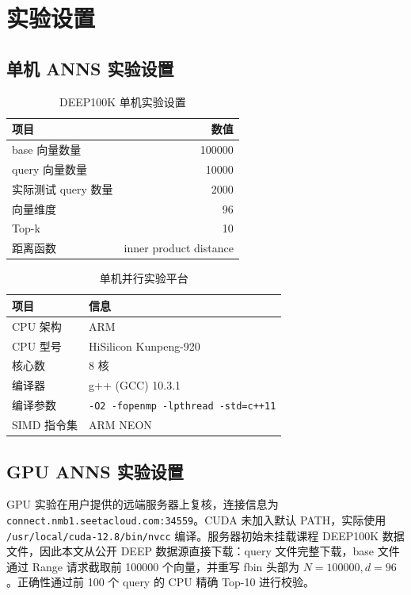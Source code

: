 \documentclass[UTF8,a4paper,10pt]{ctexart}
\begin{document}
\section{实验设置}

\subsection{单机 ANNS 实验设置}

\begin{table}[H]
\centering
\caption{DEEP100K 单机实验设置}
\label{tab:dataset}
\begin{tabular}{lr}
\toprule
项目 & 数值 \\
\midrule
base 向量数量 & 100000 \\
query 向量数量 & 10000 \\
实际测试 query 数量 & 2000 \\
向量维度 & 96 \\
Top-k & 10 \\
距离函数 & inner product distance \\
\bottomrule
\end{tabular}
\end{table}

\begin{table}[H]
\centering
\caption{单机并行实验平台}
\label{tab:cpu_platform}
\begin{tabular}{ll}
\toprule
项目 & 信息 \\
\midrule
CPU 架构 & ARM \\
CPU 型号 & HiSilicon Kunpeng-920 \\
核心数 & 8 核 \\
编译器 & g++ (GCC) 10.3.1 \\
编译参数 & \texttt{-O2 -fopenmp -lpthread -std=c++11} \\
SIMD 指令集 & ARM NEON \\
\bottomrule
\end{tabular}
\end{table}

\subsection{GPU ANNS 实验设置}

GPU 实验在用户提供的远端服务器上复核，连接信息为 \texttt{connect.nmb1.seetacloud.com:34559}。CUDA 未加入默认 PATH，实际使用 \texttt{/usr/local/cuda-12.8/bin/nvcc} 编译。服务器初始未挂载课程 DEEP100K 数据文件，因此本文从公开 DEEP 数据源直接下载：query 文件完整下载，base 文件通过 Range 请求截取前 100000 个向量，并重写 fbin 头部为 $N=100000,d=96$。正确性通过前 100 个 query 的 CPU 精确 Top-10 进行校验。
\end{document}
